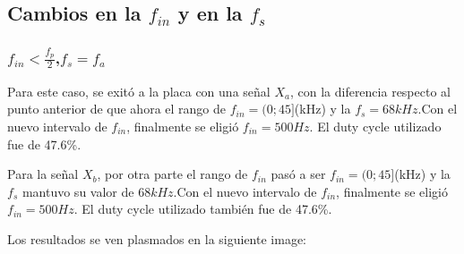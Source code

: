 \documentclass[../../ASSD_TP1_G7.tex]{subfiles}
\begin{document}
\subsection{Cambios en la $f_{in}$ y en la $f_{s}$}

\subsubsection{$f_{in}<\frac{f_{p}}{2}$,$f_{s}=f_{a}$}

Para este caso, se exitó a la placa con una señal $X_{a}$, con la
diferencia respecto al punto anterior de que ahora el rango de $f_{in}=(0;45]$(kHz)
y la $f_{s}=68kHz.$Con el nuevo intervalo de $f_{in}$, finalmente
se eligió $f_{in}=500Hz.$ El duty cycle utilizado fue de 47.6\%.

Para la señal $X_{b}$, por otra parte el rango de $f_{in}$ pasó
a ser $f_{in}=(0;45]$(kHz) y la $f_{s}$ mantuvo su valor de $68kHz.$Con
el nuevo intervalo de $f_{in}$, finalmente se eligió $f_{in}=500Hz.$
El duty cycle utilizado también fue de 47.6\%.

Los resultados se ven plasmados en la siguiente image:
\end{document}
